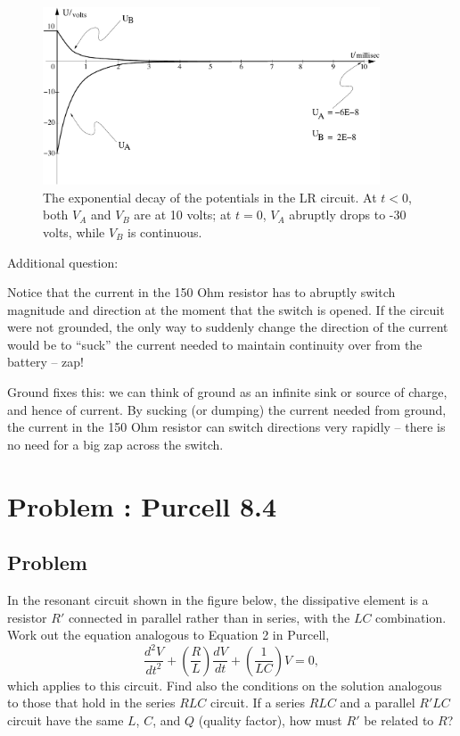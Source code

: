 \documentclass[solutions]{esg8022pset}
\begin{document}
  \begin{figure}[H]
    \centering
    \includegraphics[width = 10cm]{graph22}
    \caption{The exponential decay of the potentials in the LR circuit.
      At $t<0$, both $V_A$ and $V_B$ are at 10 volts; at $t=0$, $V_A$
      abruptly drops to -30 volts, while $V_B$ is continuous.}
    \label{fig:graph22.eps}
  \end{figure}


  Additional question:

  Notice that the current in the 150 Ohm resistor has to abruptly switch
  magnitude and direction at the moment that the switch is opened. If
  the circuit were not grounded, the only way to suddenly change the
  direction of the current would be to ``suck'' the current needed to
  maintain continuity over from the battery -- zap!

  Ground fixes this: we can think of ground as an infinite sink or
  source of charge, and hence of current. By sucking (or dumping) the
  current needed from ground, the current in the 150 Ohm resistor can
  switch directions very rapidly -- there is no need for a big zap
  across the switch.
\section{Problem \thesection: Purcell 8.4}
\subsection{Problem}
  In the resonant circuit shown in the figure below, the dissipative
  element is a resistor $R'$ connected in parallel rather than in series,
  with the $LC$ combination.  Work out the equation analogous to Equation 2
  in Purcell,
  \begin{equation*}
    \frac{d^2V}{dt^2} + \left(\frac{R}{L}\right)\frac{dV}{dt} + \left(\frac{1}{LC}\right)V = 0,
  \end{equation*}
  which applies to this circuit.  Find also the conditions on the solution
  analogous to those that hold in the series $RLC$ circuit.  If a series
  $RLC$ and a parallel $R'LC$ circuit have the same $L$, $C$, and $Q$
  (quality factor), how must $R'$ be related to $R$?
\end{document}
